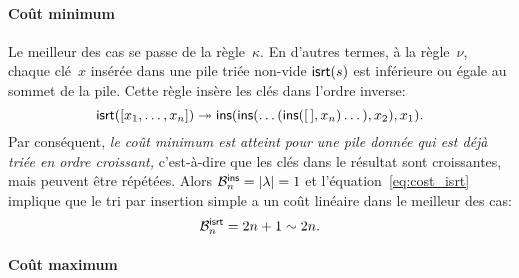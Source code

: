 \paragraph{Coût minimum}

Le meilleur des cas se passe de la règle~\(\kappa\). En d'autres
termes, à la règle~\(\nu\), chaque clé~\(x\) insérée dans une pile
triée non-vide \(\fun{isrt}(s)\) est
inférieure ou égale au sommet de la pile. Cette règle insère les clés
dans l'ordre inverse:
\begin{equation}
\fun{isrt}([x_1,\dots,x_n]) \twoheadrightarrow
\fun{ins}(\fun{ins}(\dots(\fun{ins}(\el,x_n)\dots),x_2),x_1).
\label{inv_isrt}
\end{equation}
Par conséquent, \emph{le coût minimum est atteint pour une pile donnée
  qui est déjà triée en ordre croissant,} c'est-à-dire que les clés
dans le résultat sont croissantes, mais peuvent être répétées. Alors
\(\B{\fun{ins}}{n} = \len{\lambda} = 1\)
et l'équation~\eqref{eq:cost_isrt} implique que le tri par insertion
simple a un coût linéaire dans le meilleur des cas:
\begin{equation*}
\B{\fun{isrt}}{n} = 2n+1 \sim 2n.
\end{equation*}

\paragraph{Coût maximum}


